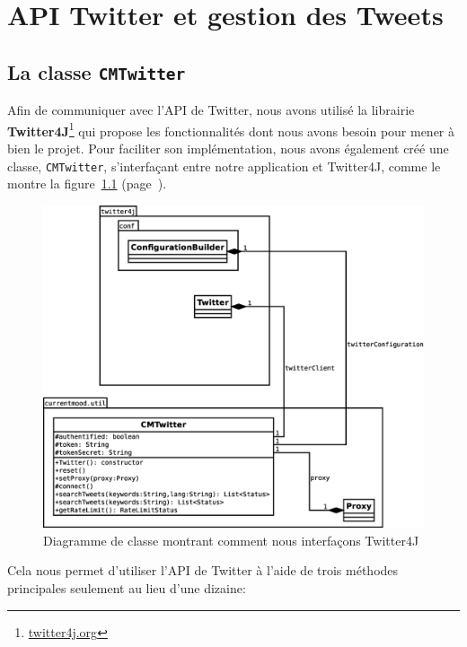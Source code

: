 \documentclass[12pt,a4paper]{report}
\begin{document}

\chapter{API Twitter et gestion des Tweets}

\section{La classe \texttt{CMTwitter}}

Afin de communiquer avec l'API de Twitter, nous avons utilisé la librairie
\textbf{Twitter4J}\footnote{\href{http://twitter4j.org}{twitter4j.org}} qui
propose les fonctionnalités dont nous avons besoin pour mener à bien le projet.
Pour faciliter son implémentation, nous avons également créé une classe,
\texttt{CMTwitter}, s'interfaçant entre notre application et Twitter4J, comme le
montre la figure~\ref{uml_cmtwitter} (page~\pageref{uml_cmtwitter}).

\begin{figure}%
	\includegraphics[width=\textwidth]{img/uml_cmtwitter.eps}
	\caption{Diagramme de classe montrant comment nous interfaçons Twitter4J}
\label{uml_cmtwitter}
\end{figure}

Cela nous permet d'utiliser l'API de Twitter à l'aide de trois méthodes
principales seulement au lieu d'une dizaine:
\end{document}
